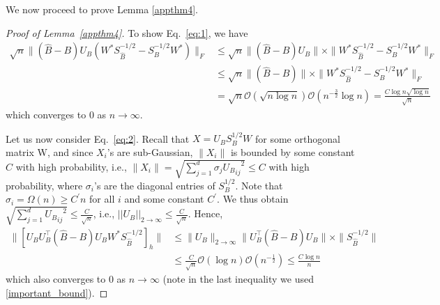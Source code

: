 We now proceed to prove Lemma \ref{appthm4}.

\begin{proof}[Proof of Lemma~\ref{appthm4}]

  To show Eq.~\eqref{eq:1}, we have
  \begin{align*}
    \sqrt{n} \| (\hat{B} -B) U_B (W^{*} S_{\hat{B}}^{-1/2} - S_B^{-1/2} W^{*}) \|_F 
    & \leq \sqrt{n} \| (\hat{B} -B) U_B \| \times \| W^{*} S_{\hat{B}}^{-1/2} - S_B^{-1/2} W^{*} \|_F \\
    &  \leq  \sqrt{n} \| (\hat{B} -B) \| \times \| W^{*} S_{\hat{B}}^{-1/2} - S_B^{-1/2} W^{*} \|_F \\
    & = \sqrt{n} \mathcal{O}(\sqrt{n \log n}) \mathcal{O}(n^{-\frac{3}{2}} \log n) = \frac{C \log n \sqrt{\log n}}{\sqrt{n}}
  \end{align*}
which converges to $0$ as $n \rightarrow \infty$.

Let us now consider Eq.~\eqref{eq:2}. Recall that $X = U_B S_B^{1/2} W$ for some orthogonal matrix W, and since $X_i$'s are sub-Gaussian, $\|X_i\|$ is bounded by some constant $C$ with high probability, i.e., $\|X_i\| = \sqrt{\sum\limits_{j=1}^d \sigma_j {{U_B}_{ij}}^2} \leq C$ with high probability, where $\sigma_i$'s are the diagonal entries of $S_B^{1/2}$. Note that 
$\sigma_i = \Omega(n) \geq C^{'}n$ for all $i$ and some constant $C^{'}$. We thus obtain
$\sqrt{\sum_{j = 1}^{d} {{U_B}_{ij}}^2} \leq \frac{C}{\sqrt{n}}$,  i.e., $||U_B||_{2 {\to} \infty} \leq \frac{C}{\sqrt{n}}.$
Hence, 
\begin{equation*}
\begin{split}
\| [ U_B U_B^{\top} (\hat{B} - B) U_B W^{*} S_{\hat{B}}^{-1/2}]_{h} \| & \leq \|U_B\|_{2 {\to} \infty} \| U_B^{\top} (\hat{B} - B) U_B \| \times \|S_{\hat{B}}^{-1/2}\| \\
& \leq \frac{C}{\sqrt{n}} \mathcal{O}( \log n) \mathcal{O}(n^{-\frac{1}{2}} ) \leq \frac{C \log n}{n} 
\end{split}
\end{equation*}
which also converges to $0$ as $n \rightarrow \infty$ (note in the last inequality we used \ref{important_bound}).
  

\end{proof}
